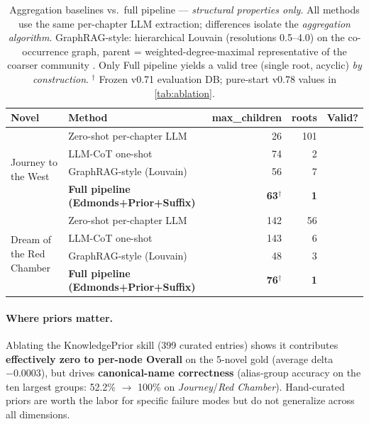 \documentclass[11pt]{article}
\newcommand{\cmark}{\ding{51}}
\newcommand{\xmark}{\ding{55}}
\begin{document}
\begin{table}[t]
\centering
\footnotesize
\setlength{\tabcolsep}{3pt}
\begin{tabular}{llrrc}
\toprule
\textbf{Novel} & \textbf{Method} & \textbf{max\_children} & \textbf{roots} & \textbf{Valid?} \\
\midrule
\multirow{4}{*}{Journey to the West}
 & Zero-shot per-chapter LLM & 26 & 101 & \xmark \\
 & LLM-CoT one-shot & 74 & 2 & \xmark \\
 & GraphRAG-style (Louvain) & 56 & 7 & \xmark \\
 & \textbf{Full pipeline (Edmonds+Prior+Suffix)} & \textbf{63}$^\dagger$ & \textbf{1} & \cmark \\
\midrule
\multirow{4}{*}{Dream of the Red Chamber}
 & Zero-shot per-chapter LLM & 142 & 56 & \xmark \\
 & LLM-CoT one-shot & 143 & 6 & \xmark \\
 & GraphRAG-style (Louvain) & 48 & 3 & \xmark \\
 & \textbf{Full pipeline (Edmonds+Prior+Suffix)} & \textbf{76}$^\dagger$ & \textbf{1} & \cmark \\
\bottomrule
\end{tabular}
\caption{Aggregation baselines vs.\ full pipeline --- \emph{structural properties only}. All methods use the same per-chapter LLM extraction; differences isolate the \textit{aggregation algorithm}. GraphRAG-style: hierarchical Louvain (resolutions 0.5--4.0) on the co-occurrence graph, parent = weighted-degree-maximal representative of the coarser community \cite{edge2024graphrag}. Only Full pipeline yields a valid tree (single root, acyclic) \emph{by construction}. $^\dagger$ Frozen v0.71 evaluation DB; pure-start v0.78 values in \autoref{tab:ablation}.}
\label{tab:llm-baselines}
\end{table}

\paragraph{Where priors matter.}
\label{sec:priors}
Ablating the KnowledgePrior skill (399 curated entries) shows it contributes \textbf{effectively zero to per-node Overall} on the 5-novel gold (average delta $-0.0003$), but drives \textbf{canonical-name correctness} (alias-group accuracy on the ten largest groups: 52.2\% $\rightarrow$ 100\% on \textit{Journey}/\textit{Red Chamber}). Hand-curated priors are worth the labor for specific failure modes but do not generalize across all dimensions.
\end{document}
